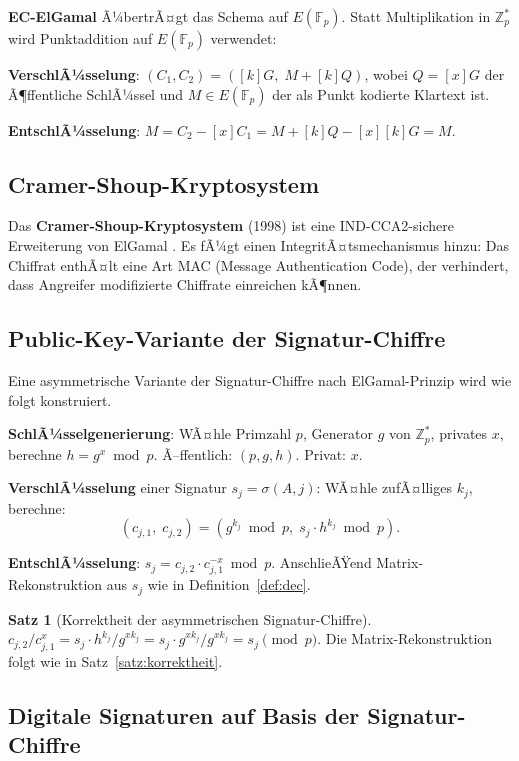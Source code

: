 ﻿\documentclass[a4paper,12pt]{scrreprt}
\theoremstyle{definition}
\newtheorem{satz}{Satz}[section]
\begin{document}
\textbf{EC-ElGamal} Ã¼bertrÃ¤gt das Schema auf $E(\mathbb{F}_p)$. Statt Multiplikation in $\mathbb{Z}_p^*$ wird Punktaddition auf $E(\mathbb{F}_p)$ verwendet:

\textbf{VerschlÃ¼sselung}: $(C_1, C_2) = ([k]G,\; M + [k]Q)$, wobei $Q = [x]G$ der Ã¶ffentliche SchlÃ¼ssel und $M \in E(\mathbb{F}_p)$ der als Punkt kodierte Klartext ist.

\textbf{EntschlÃ¼sselung}: $M = C_2 - [x]C_1 = M + [k]Q - [x][k]G = M$.

\subsection{Cramer-Shoup-Kryptosystem}

Das \textbf{Cramer-Shoup-Kryptosystem} (1998) ist eine IND-CCA2-sichere Erweiterung von ElGamal \cite{ElG85}. Es fÃ¼gt einen IntegritÃ¤tsmechanismus hinzu: Das Chiffrat enthÃ¤lt eine Art MAC (Message Authentication Code), der verhindert, dass Angreifer modifizierte Chiffrate einreichen kÃ¶nnen.

\subsection{Public-Key-Variante der Signatur-Chiffre}

Eine asymmetrische Variante der Signatur-Chiffre nach ElGamal-Prinzip wird wie folgt konstruiert.

\textbf{SchlÃ¼sselgenerierung}: WÃ¤hle Primzahl $p$, Generator $g$ von $\mathbb{Z}_p^*$, privates $x$, berechne $h = g^x \bmod p$. Ã–ffentlich: $(p, g, h)$. Privat: $x$.

\textbf{VerschlÃ¼sselung} einer Signatur $s_j = \sigma(A,j)$: WÃ¤hle zufÃ¤lliges $k_j$, berechne:
\[
(c_{j,1},\; c_{j,2}) = (g^{k_j} \bmod p,\; s_j \cdot h^{k_j} \bmod p).
\]

\textbf{EntschlÃ¼sselung}: $s_j = c_{j,2} \cdot c_{j,1}^{-x} \bmod p$. AnschlieÃŸend Matrix-Rekonstruktion aus $s_j$ wie in Definition~\ref{def:dec}.

\begin{satz}[Korrektheit der asymmetrischen Signatur-Chiffre]
$c_{j,2} / c_{j,1}^x = s_j \cdot h^{k_j} / g^{xk_j} = s_j \cdot g^{xk_j} / g^{xk_j} = s_j \pmod{p}$. Die Matrix-Rekonstruktion folgt wie in Satz~\ref{satz:korrektheit}.
\end{satz}

\subsection{Digitale Signaturen auf Basis der Signatur-Chiffre}
\end{document}
